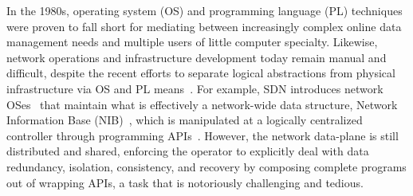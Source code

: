 \label{sec:intro}


In the 1980s, operating system (OS) and programming language (PL)
techniques were proven to fall short for mediating between
increasingly complex online data management needs and multiple users
of little computer specialty. Likewise, network operations and
infrastructure development today remain manual and difficult, despite the
recent efforts to separate logical abstractions from physical
infrastructure via OS and PL
means~\cite{ethane-sigcomm07,rethinking-enterprise,shenker-tue}. For
example, SDN introduces network OSes~\cite{onix,nox} that maintain
what is effectively a
network-wide data structure, \eg Network Information Base
(NIB)~\cite{onix}, which is manipulated at a logically centralized
controller through programming
APIs~\cite{composing,sdn-lang-frenetic}. However, the network
data-plane is still distributed and shared, enforcing the operator to
explicitly deal with data redundancy, isolation, consistency, and
recovery by composing complete programs out of wrapping APIs, a task
that is notoriously challenging and tedious.  






